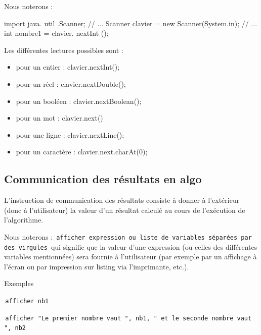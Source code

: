 \documentclass[11pt,a4paper]{article}
\begin{document}
            \par
        
          Nous noterons :
          
            \par
        \begin{Java}
 import java. util .Scanner;
// ...
Scanner clavier = new Scanner(System.in);
// ...
int nombre1 = clavier. nextInt ();
				\end{Java}
          Les diff\'erentes lectures possibles sont :
          
					\begin{itemize}
				
			\item pour un entier : clavier.nextInt();
			\item pour un r\'eel : clavier.nextDouble();
			\item pour un bool\'een : clavier.nextBoolean();
			\item pour un mot : clavier.next()
			\item pour une ligne : clavier.nextLine();
			\item pour un caract\`ere : clavier.next.charAt(0);
					\end{itemize}
				
            \par
        \subsection{Communication des r\'esultats en algo}
          L'instruction de communication des r\'esultats consiste \`a donner \`a l'ext\'erieur (donc \`a l'utilisateur) 
          la valeur d'un r\'esultat calcul\'e au cours de l'ex\'ecution de l'algorithme.
        
            \par
        
          Nous noterons :
          \,\verb|afficher expression ou liste de variables séparées par des virgules|\,
          qui signifie que la valeur d'une expression (ou celles des diff\'erentes variables mentionn\'ees) 
          sera fournie \`a l'utilisateur (par exemple par un affichage \`a l'\'ecran ou par impression sur
          listing via l'imprimante, etc.).
          
            \par
        
          Exemples \par
				\par
				\,\verb|afficher nb1|\,\par
				\par
				\,\verb|afficher "Le premier nombre vaut ", nb1, " et le seconde nombre vaut ", nb2 |\,
            \par
        
\end{document}
